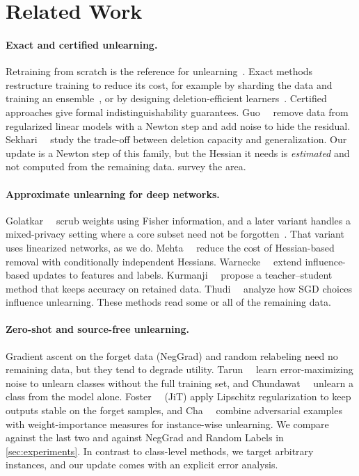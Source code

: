 \documentclass[10pt,twocolumn,letterpaper]{article}
\begin{document}
\section{Related Work}
\label{sec:related_work}
\paragraph{Exact and certified unlearning.}
Retraining from scratch is the reference for unlearning~\cite{cao2015towards}. Exact methods restructure training to reduce its cost, for example by sharding the data and training an ensemble~\cite{bourtoule2021machine}, or by designing deletion-efficient learners~\cite{ginart2019making}. Certified approaches give formal indistinguishability guarantees. Guo~\etal~\cite{guo2020certified} remove data from regularized linear models with a Newton step and add noise to hide the residual. Sekhari~\etal~\cite{sekhari2021remember} study the trade-off between deletion capacity and generalization. Our update is a Newton step of this family, but the Hessian it needs is \emph{estimated} and not computed from the remaining data. \citet{xu2023machine} survey the area.

\paragraph{Approximate unlearning for deep networks.}
Golatkar~\etal~\cite{golatkar2020eternal} scrub weights using Fisher information, and a later variant handles a mixed-privacy setting where a core subset need not be forgotten~\cite{golatkar2021mixed}. That variant uses linearized networks, as we do. Mehta~\etal~\cite{mehta2022deep} reduce the cost of Hessian-based removal with conditionally independent Hessians. Warnecke~\etal~\cite{warnecke2023machine} extend influence-based updates to features and labels. Kurmanji~\etal~\cite{kurmanji2023towards} propose a teacher--student method that keeps accuracy on retained data. Thudi~\etal~\cite{thudi2022unrolling} analyze how SGD choices influence unlearning. These methods read some or all of the remaining data.

\paragraph{Zero-shot and source-free unlearning.}
Gradient ascent on the forget data (NegGrad) and random relabeling need no remaining data, but they tend to degrade utility. Tarun~\etal~\cite{tarun2023fast} learn error-maximizing noise to unlearn classes without the full training set, and Chundawat~\etal~\cite{chundawat2023zero} unlearn a class from the model alone. Foster~\etal~\cite{foster2024zero} (JiT) apply Lipschitz regularization to keep outputs stable on the forget samples, and Cha~\etal~\cite{cha2024learning} combine adversarial examples with weight-importance measures for instance-wise unlearning. We compare against the last two and against NegGrad and Random Labels in \cref{sec:experiments}. In contrast to class-level methods, we target arbitrary instances, and our update comes with an explicit error analysis.
\end{document}
